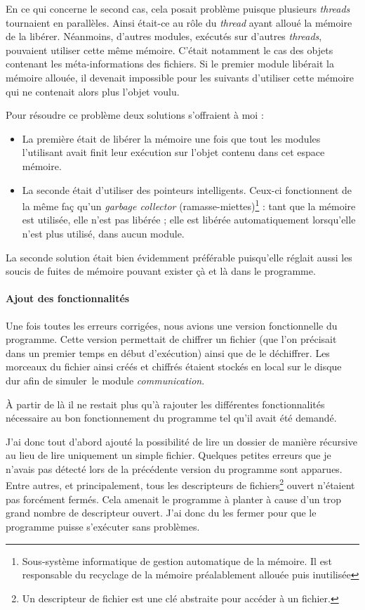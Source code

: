 \documentclass[a4paper,10pt, twoside]{report}
\begin{document}
\begin{spacing}{1.2}
En ce qui concerne le second cas, cela posait problème puisque plusieurs
\textit{threads} tournaient en parallèles. Ainsi était-ce au rôle du
\textit{thread} ayant alloué la mémoire de la libérer. Néanmoins,
d'autres modules, exécutés sur d'autres \textit{threads}, pouvaient utiliser
cette même mémoire. C'était notamment le cas des objets contenant les
méta-informations des fichiers. Si le premier module libérait la mémoire
allouée, il devenait impossible pour les suivants d'utiliser cette mémoire
qui ne contenait alors plus l'objet voulu.

Pour résoudre ce problème deux solutions s'offraient à moi :
\begin{itemize}
 \item La première était de libérer la mémoire une fois que tout les
 modules l'utilisant avait finit leur exécution sur l'objet contenu dans cet
 espace mémoire.
 \item La seconde était d'utiliser des pointeurs intelligents. Ceux-ci
 fonctionnent de la même faç qu'un \textit{garbage collector}
 (ramasse-miettes)\footnote{ Sous-système informatique de gestion automatique
 de la mémoire. Il est responsable du recyclage de la mémoire
 préalablement allouée puis inutilisée} : tant que la mémoire est
 utilisée, elle n'est pas libérée ; elle est libérée automatiquement
 lorsqu'elle n'est plus utilisé, dans aucun module.
\end{itemize}

La seconde solution était bien évidemment préférable puisqu'elle
réglait aussi les soucis de fuites de mémoire pouvant exister çà et
là dans le programme.

\paragraph{Ajout des fonctionnalités}
Une fois toutes les erreurs corrigées, nous avions une version fonctionnelle
du programme. Cette version permettait de chiffrer un fichier (que l'on
précisait dans un premier temps en début d'exécution) ainsi que de le
déchiffrer. Les morceaux du fichier ainsi créés et chiffrés étaient
stockés en local sur le disque dur afin de \flqq simuler\frqq~le module
\textit{communication}.

À partir de là il ne restait plus qu'à rajouter les différentes
fonctionnalités nécessaire au bon fonctionnement du programme tel qu'il
avait été demandé.

J'ai donc tout d'abord ajouté la possibilité de lire un dossier de
manière récursive au lieu de lire uniquement un simple fichier. Quelques
petites erreurs que je n'avais pas détecté lors de la précédente
version du programme sont apparues. Entre autres, et principalement, tous les
descripteurs de fichiers\footnote{Un descripteur de fichier est une clé
abstraite pour accéder à un fichier.} ouvert n'étaient pas forcément
fermés. Cela amenait le programme à planter à cause d'un trop grand
nombre de descripteur ouvert. J'ai donc du les fermer pour que le programme
puisse s'exécuter sans problèmes.


\end{spacing}
\end{document}
